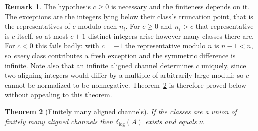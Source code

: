 \documentclass[11pt]{article}
\theoremstyle{plain}
\newtheorem{theorem}{Theorem}[section]
\theoremstyle{definition}
\newtheorem{remark}[theorem]{Remark}
\newcommand{\dlog}{\delta_{\log}}
\begin{document}
\begin{remark}
The hypothesis $c\ge0$ is necessary and the finiteness depends
on it.  The exceptions are the integers lying below their
class's truncation point, that is the representatives of $c$
modulo each $n_i$.  For $c\ge0$ and $n_i>c$ that representative
is $c$ itself, so at most $c+1$ distinct integers arise however
many classes there are.  For $c<0$ this fails badly: with
$c=-1$ the representative modulo $n$ is $n-1<n$, so \emph{every}
class contributes a fresh exception and the symmetric difference
is infinite.  Note also that an infinite aligned channel
determines $c$ uniquely, since two aligning integers would
differ by a multiple of arbitrarily large moduli; so $c$ cannot
be normalized to be nonnegative.  Theorem~\ref{thm:chan} is
therefore proved below without appealing to this theorem.
\end{remark}

\begin{theorem}[Finitely many aligned channels]\label{thm:chan}
If the classes are a union of finitely many \emph{aligned}
channels then $\dlog(A)$ exists and equals $\nu$.
\end{theorem}
\end{document}
